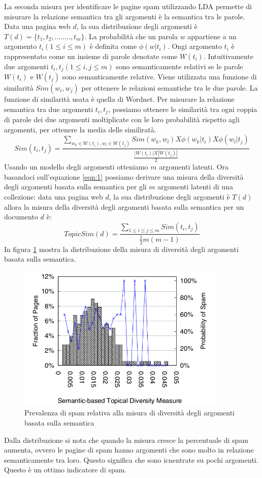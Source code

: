 La seconda misura per identificare le pagine spam utilizzando LDA permette di misurare la relazione semantica tra gli argomenti è  la semantica tra le parole. Data una pagina web \(d\), la sua distribuzione degli argomenti è \(T(d)=\{t_1,t_2,........,t_m\}\). La probabilità che un parola \(w\) appartiene a un argomento \(t_i (1 \leq i \leq m )\) è definita come \(\phi(w|t_i)\). Ongi argomento \(t_i\) è rappresentato come un insieme di parole denotate come \(W(t_i)\). Intuitivamente due argomenti \(t_i, t_j (1 \leq i, j \leq m)\) sono semanticamente relativi se le parole \(W(t_i)\) e \(W(t_j)\) sono semanticamente relative. Viene utilizzata una funzione di similarità \(Sim(w_i,w_j)\) per ottenere le relazioni semantiche tra le due parole. La funzione di similarità usata è quella di Wordnet. Per misurare la relazione semantica tra due argomenti \(t_i,t_j\), possiamo ottenere le similarità tra ogni coppia di parole dei due argomenti moltiplicate con le loro probabilità rispetto agli argomenti, per ottenere la 
media delle similiratà.
\begin{equation}
\label{eqn:1}
Sim(t_i,t_j) = \frac{\sum_{w_k \in W(t_i),w_l \in W(t_j)}Sim(w_k,w_l) X \phi(w_k|t_i) X \phi(w_l|t_j)}{\frac{|W(t_i)| X |W(t_j)|}{2}}	
\end{equation}
Usando un modello degli argomenti otteniamo \(m\) argomenti latenti. Ora basandoci sull'equazione \ref{eqn:1} possiamo derivare una misura della diversità degli argomenti basata sulla semantica per gli \(m\) argomenti latenti di una collezione: data una pagina web \(d\), la sua distribuzione degli argomenti è \(T(d)\) allora la misura della diversità degli argomenti basata sulla semantica per un documento \(d\) è:
\begin{equation}
TopicSim(d)=\frac{\sum_{1 \leq i \leq j \leq m} Sim(t_i,t_j)}{\frac{1}{2} m(m-1)}
\end{equation}
In figura \ref{fig:zhou3} mostra la distribuzione della misura di diversità degli argomenti basata sulla semantica.
\begin{figure}
\centering
\includegraphics[width=10cm]{immagini/zhou/immagine3}
\caption{Prevalenza di spam relativa alla misura di diversità degli argomenti basata sulla semantica}
\label{fig:zhou3}
\end{figure}
Dalla distribuzione si nota che quando la misura cresce la percentuale di spam aumenta, ovvero le pagine di spam hanno argomenti che sono molto in relazione semanticamente tra loro. Questo significa che sono icnentrate su pochi argomenti. Questo è un ottimo indicatore di spam.

